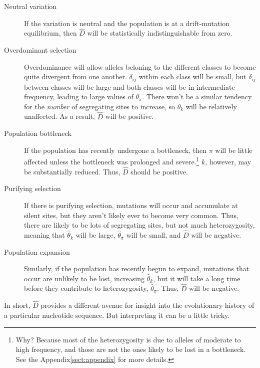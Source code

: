 \documentclass[12pt]{article}
\begin{document}
\begin{description}

\item[Neutral variation] If the variation is neutral and the
  population is at a drift-mutation equilibrium, then $\hat D$ will be
  statistically indistinguishable from zero.

\item[Overdominant selection] Overdominance will allow alleles
  beloning to the different classes to become quite divergent from one
  another. $\delta_{ij}$ within each class will be small, but
  $\delta_{ij}$ between classes will be large and both classes will be
  in intermediate frequency, leading to large values of
  $\theta_\pi$. There won't be a similar tendency for the {\it
  number\/} of segregating sites to increase, so $\theta_k$ will be
  relatively unaffected. As a result, $\hat D$ will be positive.

\item[Population bottleneck] If the population has recently undergone
  a bottleneck, then $\pi$ will be little affected unless the
  bottleneck was prolonged and severe.\footnote{Why? Because most of
    the heterozygosity is due to alleles of moderate to high
    frequency, and those are not the ones likely to be lost in a
    bottleneck. See the Appendix\ref{sect:appendix} for more details.}
  $k$, however, may be substantially reduced. Thus, $\hat D$ should be
  positive.

\item[Purifying selection] If there is purifying selection, mutations
  will occur and accumulate at silent sites, but they aren't likely
  ever to become very common. Thus, there are likely to be lots of
  segregating sites, but not much heterozygosity, meaning that
  $\hat\theta_k$ will be large, $\hat\theta_\pi$ will be small, and
  $\hat D$ will be negative.

\item[Population expansion] Similarly, if the population has recently
  begun to expand, mutations that occur are unlikely to be lost,
  increasing $\hat\theta_k$, but it will take a long time before they
  contribute to heterozygosity, $\hat\theta_\pi$. Thus, $\hat D$ will
  be negative.

\end{description}

In short, $\hat D$ provides a different avenue for insight into the
evolutionary history of a particular nucleotide sequence. But
interpreting it can be a little tricky. 
\end{document}
